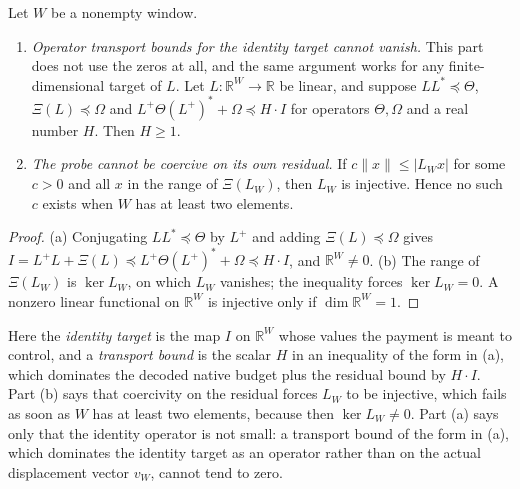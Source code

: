 \documentclass[11pt]{article}
\theoremstyle{definition}
\begin{document}
\begin{proposition}
\label{prop:rh:window-obstructions}
Let \(W\) be a nonempty window.
\begin{enumerate}[label=\textup{(\alph*)}]
  \item \emph{Operator transport bounds for the identity target cannot
    vanish.}  This part does not use the zeros at all, and the same
    argument works for any finite-dimensional target of \(L\).  Let
    \(L:\mathbb R^W\to\mathbb R\) be linear, and suppose
    \(LL^*\preceq\Theta\), \(\Xi(L)\preceq\Omega\) and
    \(L^+\Theta(L^+)^*+\Omega\preceq H\cdot I\) for operators
    \(\Theta,\Omega\) and a real number \(H\).  Then \(H\geq1\).
  \item \emph{The probe cannot be coercive on its own residual.}  If
    \(c\|x\|\leq|L_W x|\) for some \(c>0\) and all \(x\) in the range of
    \(\Xi(L_W)\), then \(L_W\) is injective.  Hence no such \(c\) exists when \(W\) has at
    least two elements.
\end{enumerate}
\end{proposition}

\begin{proof}
(a) Conjugating \(LL^*\preceq\Theta\) by \(L^+\) and adding
\(\Xi(L)\preceq\Omega\) gives
\(I=L^+L+\Xi(L)\preceq L^+\Theta(L^+)^*+\Omega\preceq H\cdot I\), and
\(\mathbb R^W\neq0\).  (b) The range of \(\Xi(L_W)\) is \(\ker L_W\), on
which \(L_W\) vanishes; the inequality forces \(\ker L_W=0\).  A nonzero
linear functional on \(\mathbb R^W\) is injective only if
\(\dim\mathbb R^W=1\).
\end{proof}

Here the \emph{identity target} is the map \(I\) on \(\mathbb R^W\) whose
values the payment is meant to control, and a \emph{transport bound} is
the scalar \(H\) in an inequality of the form in (a), which dominates the
decoded native budget plus the residual bound by \(H\cdot I\).  Part (b) says that coercivity on the residual forces \(L_W\) to be
injective, which fails as soon as \(W\) has at least two elements,
because then \(\ker L_W\neq0\).  Part (a) says only that
the identity operator is not small: a transport
bound of the form in (a), which dominates the identity target as an
operator rather than on the actual displacement vector \(v_W\), cannot
tend to zero.
\end{document}
